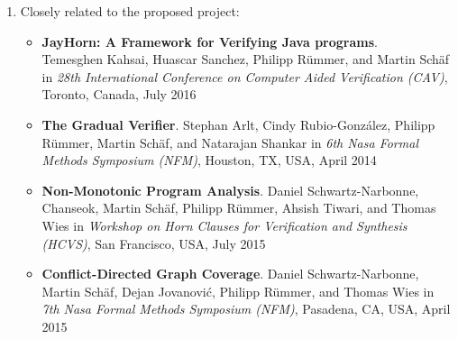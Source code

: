 \documentclass{article}
\begin{document}
\begin{enumerate}
\item Closely related to the proposed project:
\begin{itemize}

\item \textbf{JayHorn: A Framework for Verifying Java programs}.
\\ Temesghen Kahsai, Huascar Sanchez, Philipp R\"ummer, and Martin Sch\"af in 
\emph{28th International Conference on Computer Aided Verification (CAV)},
Toronto, Canada, July 2016

\item \textbf{The Gradual Verifier}.
Stephan Arlt, Cindy Rubio-Gonz\'alez, Philipp R\"ummer,
Martin Sch\"af, and Natarajan Shankar in \emph{6th Nasa Formal Methods
Symposium (NFM)}, Houston, TX, USA, April 2014

\item \textbf{Non-Monotonic Program Analysis}.
Daniel Schwartz-Narbonne, Chanseok, Martin Sch\"af, Philipp R\"ummer, Ahsish
Tiwari, and Thomas Wies in \emph{Workshop on Horn Clauses for Verification and
Synthesis (HCVS)}, San Francisco, USA, July 2015

\item \textbf{Conflict-Directed Graph Coverage}.
Daniel Schwartz-Narbonne, Martin Sch\"af, Dejan Jovanovi\'c, Philipp R\"ummer,
and Thomas Wies in \emph{7th Nasa Formal
Methods Symposium (NFM)}, Pasadena, CA, USA, April 2015



%
%
%


\end{itemize}
\end{enumerate}
\end{document}
